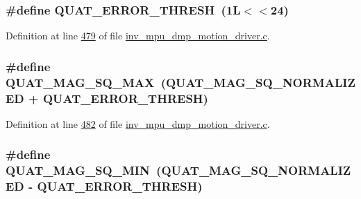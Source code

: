 \subsubsection[{\texorpdfstring{Q\+U\+A\+T\+\_\+\+E\+R\+R\+O\+R\+\_\+\+T\+H\+R\+E\+SH}{QUAT_ERROR_THRESH}}]{\setlength{\rightskip}{0pt plus 5cm}\#define Q\+U\+A\+T\+\_\+\+E\+R\+R\+O\+R\+\_\+\+T\+H\+R\+E\+SH~(1\+L$<$$<$24)}\hypertarget{group___d_r_i_v_e_r_s_ga633dcbd524d41e6f76c0fda39828c8e1}{}\label{group___d_r_i_v_e_r_s_ga633dcbd524d41e6f76c0fda39828c8e1}


Definition at line \hyperlink{inv__mpu__dmp__motion__driver_8c_source_l00479}{479} of file \hyperlink{inv__mpu__dmp__motion__driver_8c_source}{inv\+\_\+mpu\+\_\+dmp\+\_\+motion\+\_\+driver.\+c}.

\subsubsection[{\texorpdfstring{Q\+U\+A\+T\+\_\+\+M\+A\+G\+\_\+\+S\+Q\+\_\+\+M\+AX}{QUAT_MAG_SQ_MAX}}]{\setlength{\rightskip}{0pt plus 5cm}\#define Q\+U\+A\+T\+\_\+\+M\+A\+G\+\_\+\+S\+Q\+\_\+\+M\+AX~({\bf Q\+U\+A\+T\+\_\+\+M\+A\+G\+\_\+\+S\+Q\+\_\+\+N\+O\+R\+M\+A\+L\+I\+Z\+ED} + {\bf Q\+U\+A\+T\+\_\+\+E\+R\+R\+O\+R\+\_\+\+T\+H\+R\+E\+SH})}\hypertarget{group___d_r_i_v_e_r_s_ga3036f612f259f4e13c631a31fb0e7176}{}\label{group___d_r_i_v_e_r_s_ga3036f612f259f4e13c631a31fb0e7176}


Definition at line \hyperlink{inv__mpu__dmp__motion__driver_8c_source_l00482}{482} of file \hyperlink{inv__mpu__dmp__motion__driver_8c_source}{inv\+\_\+mpu\+\_\+dmp\+\_\+motion\+\_\+driver.\+c}.

\subsubsection[{\texorpdfstring{Q\+U\+A\+T\+\_\+\+M\+A\+G\+\_\+\+S\+Q\+\_\+\+M\+IN}{QUAT_MAG_SQ_MIN}}]{\setlength{\rightskip}{0pt plus 5cm}\#define Q\+U\+A\+T\+\_\+\+M\+A\+G\+\_\+\+S\+Q\+\_\+\+M\+IN~({\bf Q\+U\+A\+T\+\_\+\+M\+A\+G\+\_\+\+S\+Q\+\_\+\+N\+O\+R\+M\+A\+L\+I\+Z\+ED} -\/ {\bf Q\+U\+A\+T\+\_\+\+E\+R\+R\+O\+R\+\_\+\+T\+H\+R\+E\+SH})}\hypertarget{group___d_r_i_v_e_r_s_gae76871da254b93d8b944ec65792db252}{}\label{group___d_r_i_v_e_r_s_gae76871da254b93d8b944ec65792db252}


